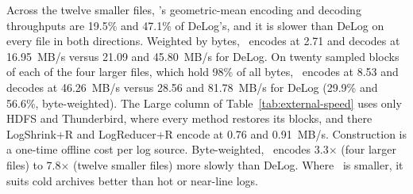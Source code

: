Across the twelve smaller files, \tool's geometric-mean encoding and decoding throughputs are 19.5\% and 47.1\% of DeLog's, and it is slower than DeLog on every file in both directions. Weighted by bytes, \tool\ encodes at 2.71 and decodes at 16.95~MB/s versus 21.09 and 45.80~MB/s for DeLog.
On twenty sampled blocks of each of the four larger files, which hold 98\% of all bytes, \tool\ encodes at 8.53 and decodes at 46.26~MB/s versus 28.56 and 81.78~MB/s for DeLog (29.9\% and 56.6\%, byte-weighted). The Large column of Table~\ref{tab:external-speed} uses only HDFS and Thunderbird, where every method restores its blocks, and there LogShrink+R and LogReducer+R encode at 0.76 and 0.91~MB/s.
Construction is a one-time offline cost per log source. Byte-weighted, \tool\ encodes 3.3$\times$ (four larger files) to 7.8$\times$ (twelve smaller files) more slowly than DeLog. Where \tool\ is smaller, it suits cold archives better than hot or near-line logs.
